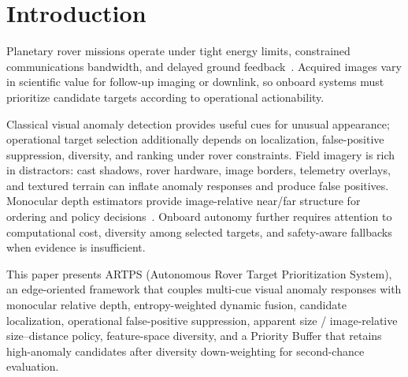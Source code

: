 \section{Introduction}
Planetary rover missions operate under tight energy limits, constrained communications bandwidth,
and delayed ground feedback~\citep{estlin2012,francis2017aegis}.
Acquired images vary in scientific value for follow-up imaging or downlink, so
onboard systems must prioritize candidate targets according to operational actionability.

Classical visual anomaly detection provides useful cues for unusual appearance; operational
target selection additionally depends on localization, false-positive suppression, diversity,
and ranking under rover constraints.
Field imagery is rich in distractors: cast shadows, rover hardware, image borders, telemetry
overlays, and textured terrain can inflate anomaly responses and produce false positives.
Monocular depth estimators provide image-relative near/far structure for ordering and policy
decisions~\citep{ranftl2021dpt}.
Onboard autonomy further requires attention to computational cost, diversity among selected
targets, and safety-aware fallbacks when evidence is insufficient.

This paper presents ARTPS (Autonomous Rover Target Prioritization System), an edge-oriented
framework that couples multi-cue visual anomaly responses with monocular relative depth,
entropy-weighted dynamic fusion, candidate localization, operational false-positive
suppression, apparent size / image-relative size--distance policy, feature-space diversity,
and a Priority Buffer that retains high-anomaly candidates after diversity down-weighting
for second-chance evaluation.

